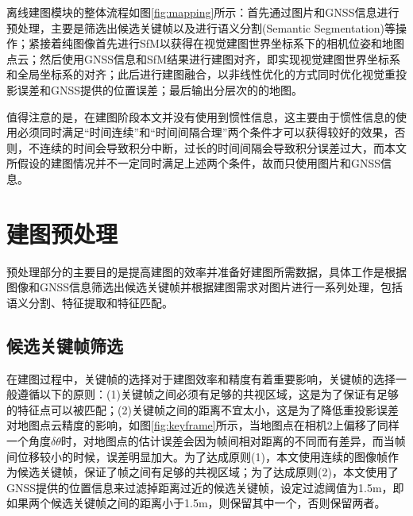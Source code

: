 离线建图模块的整体流程如图\ref{fig:mapping}所示：首先通过图片和GNSS信息进行预处理，主要是筛选出候选关键帧以及进行语义分割(Semantic Segmentation)等操作；紧接着纯图像首先进行SfM以获得在视觉建图世界坐标系下的相机位姿和地图点云；然后使用GNSS信息和SfM结果进行建图对齐，即实现视觉建图世界坐标系和全局坐标系的对齐；此后进行建图融合，以非线性优化的方式同时优化视觉重投影误差和GNSS提供的位置误差；最后输出分层次的的地图。

值得注意的是，在建图阶段本文并没有使用到惯性信息，这主要由于惯性信息的使用必须同时满足“时间连续”和“时间间隔合理”两个条件才可以获得较好的效果，否则，不连续的时间会导致积分中断，过长的时间间隔会导致积分误差过大，而本文所假设的建图情况并不一定同时满足上述两个条件，故而只使用图片和GNSS信息。

\section{建图预处理}
预处理部分的主要目的是提高建图的效率并准备好建图所需数据，具体工作是根据图像和GNSS信息筛选出候选关键帧并根据建图需求对图片进行一系列处理，包括语义分割、特征提取和特征匹配。

\subsection{候选关键帧筛选}
在建图过程中，关键帧的选择对于建图效率和精度有着重要影响，关键帧的选择一般遵循以下的原则：(1)关键帧之间必须有足够的共视区域，这是为了保证有足够的特征点可以被匹配；(2)关键帧之间的距离不宜太小，这是为了降低重投影误差对地图点云精度的影响，如图\ref{fig:keyframe}所示，当地图点在相机2上偏移了同样一个角度$\delta \theta$时，对地图点的估计误差会因为帧间相对距离的不同而有差异，而当帧间位移较小的时候，误差明显加大。为了达成原则(1)，本文使用连续的图像帧作为候选关键帧，保证了帧之间有足够的共视区域；为了达成原则(2)，本文使用了GNSS提供的位置信息来过滤掉距离过近的候选关键帧，设定过滤阈值为1.5m，即如果两个候选关键帧之间的距离小于1.5m，则保留其中一个，否则保留两者。

